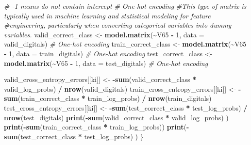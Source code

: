 \documentclass[
]{article}
\newenvironment{Shaded}{\begin{snugshade}}{\end{snugshade}}
\newcommand{\AttributeTok}[1]{\textcolor[rgb]{0.13,0.29,0.53}{#1}}
\newcommand{\CommentTok}[1]{\textcolor[rgb]{0.56,0.35,0.01}{\textit{#1}}}
\newcommand{\DecValTok}[1]{\textcolor[rgb]{0.00,0.00,0.81}{#1}}
\newcommand{\FunctionTok}[1]{\textcolor[rgb]{0.13,0.29,0.53}{\textbf{#1}}}
\newcommand{\NormalTok}[1]{#1}
\newcommand{\OtherTok}[1]{\textcolor[rgb]{0.56,0.35,0.01}{#1}}
\newcommand{\SpecialCharTok}[1]{\textcolor[rgb]{0.81,0.36,0.00}{\textbf{#1}}}
\begin{document}
\begin{Shaded}
\begin{Highlighting}[]
\CommentTok{\# {-}1 means do not contain intercept}
\CommentTok{\# One{-}hot encoding}
 \CommentTok{\#This type of matrix is typically used in machine learning and statistical modeling for feature      \#engineering, particularly when converting categorical variables into dummy variables. }
\NormalTok{  valid\_correct\_class }\OtherTok{\textless{}{-}} \FunctionTok{model.matrix}\NormalTok{(}\SpecialCharTok{\textasciitilde{}}\NormalTok{V65 }\SpecialCharTok{{-}} \DecValTok{1}\NormalTok{, }\AttributeTok{data =}\NormalTok{ valid\_digitals)  }\CommentTok{\# One{-}hot encoding}
\NormalTok{  train\_correct\_class }\OtherTok{\textless{}{-}} \FunctionTok{model.matrix}\NormalTok{(}\SpecialCharTok{\textasciitilde{}}\NormalTok{V65 }\SpecialCharTok{{-}} \DecValTok{1}\NormalTok{, }\AttributeTok{data =}\NormalTok{ train\_digitals)  }\CommentTok{\# One{-}hot encoding}
\NormalTok{  test\_correct\_class }\OtherTok{\textless{}{-}} \FunctionTok{model.matrix}\NormalTok{(}\SpecialCharTok{\textasciitilde{}}\NormalTok{V65 }\SpecialCharTok{{-}} \DecValTok{1}\NormalTok{, }\AttributeTok{data =}\NormalTok{ test\_digitals)  }\CommentTok{\# One{-}hot encoding}
  
\NormalTok{  valid\_cross\_entropy\_errors[[ki]] }\OtherTok{\textless{}{-}} \SpecialCharTok{{-}}\FunctionTok{sum}\NormalTok{(valid\_correct\_class }\SpecialCharTok{*}\NormalTok{ valid\_log\_probs) }\SpecialCharTok{/} \FunctionTok{nrow}\NormalTok{(valid\_digitals)}
\NormalTok{  train\_cross\_entropy\_errors[[ki]] }\OtherTok{\textless{}{-}} \SpecialCharTok{{-}}\FunctionTok{sum}\NormalTok{(train\_correct\_class }\SpecialCharTok{*}\NormalTok{ train\_log\_probs) }\SpecialCharTok{/} \FunctionTok{nrow}\NormalTok{(train\_digitals)}
\NormalTok{  test\_cross\_entropy\_errors[[ki]] }\OtherTok{\textless{}{-}} \SpecialCharTok{{-}}\FunctionTok{sum}\NormalTok{(test\_correct\_class }\SpecialCharTok{*}\NormalTok{ test\_log\_probs) }\SpecialCharTok{/} \FunctionTok{nrow}\NormalTok{(test\_digitals)}
  \FunctionTok{print}\NormalTok{(}\SpecialCharTok{{-}}\FunctionTok{sum}\NormalTok{(valid\_correct\_class }\SpecialCharTok{*}\NormalTok{ valid\_log\_probs) )}
  \FunctionTok{print}\NormalTok{(}\SpecialCharTok{{-}}\FunctionTok{sum}\NormalTok{(train\_correct\_class }\SpecialCharTok{*}\NormalTok{ train\_log\_probs))}
  \FunctionTok{print}\NormalTok{(}\SpecialCharTok{{-}}\FunctionTok{sum}\NormalTok{(test\_correct\_class }\SpecialCharTok{*}\NormalTok{ test\_log\_probs) )}
\NormalTok{\}}
\end{Highlighting}
\end{Shaded}
\end{document}
